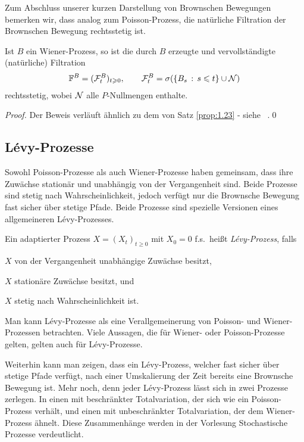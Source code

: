 Zum Abschluss unserer kurzen Darstellung von Brownschen
Bewegungen bemerken wir, dass analog zum Poisson-Prozess, die natürliche
Filtration der Brownschen Bewegung rechtsstetig ist.

\begin{prop}
\label{prop:1.28}
Ist $B$ ein Wiener-Prozess, so ist die durch $B$ erzeugte und vervollständigte
(natürliche) Filtration
  \begin{align*}
\F^B=(\FF_t^B)_{t\ge 0},\qquad \FF_t^B = \sigma(\setdef{B_s}{ s \le t}\cup \NN)
\end{align*}
rechtsstetig, wobei $\mathcal{N}$ alle $P$-Nullmengen enthalte.\fish
\end{prop}

\begin{proof}
Der Beweis verläuft ähnlich zu dem von Satz \ref{prop:1.23} - siehe
\cite[Proposition~2.7.7]{Karatzas:1991ws}~.\qed
\end{proof}

\subsection{L\'{e}vy-Prozesse}

Sowohl Poisson-Prozesse als auch Wiener-Prozesse haben gemeinsam, dass ihre
Zuwächse stationär und unabhängig von der Vergangenheit sind. Beide
Prozesse sind stetig nach Wahrscheinlichkeit, jedoch verfügt nur
die Brownsche Bewegung fast sicher über stetige Pfade. Beide Prozesse sind
spezielle Versionen eines allgemeineren L\'{e}vy-Prozesses.

\begin{defn}
\label{defn:1.16}
Ein adaptierter Prozess $X=(X_t)_{t \ge 0}$ mit $X_0=0$ f.s.\ heißt
\emph{L\'{e}vy-Prozess}, falls
\begin{defnenum}
\item $X$ von der Vergangenheit unabhängige Zuwächse besitzt,
\item $X$ stationäre Zuwächse besitzt, und
\item $X$ stetig nach Wahrscheinlichkeit ist.\fish
\end{defnenum}
\end{defn}

Man kann L\'{e}vy-Prozesse als eine Verallgemeinerung von Poisson- und
Wiener-Prozessen betrachten. Viele Aussagen, die für Wiener- oder
Poisson-Prozesse gelten, gelten auch für L\'{e}vy-Prozesse. 

Weiterhin kann man zeigen, dass ein L\'{e}vy-Prozess, welcher fast sicher über
stetige Pfade verfügt, nach einer Umskalierung der Zeit bereits eine Brownsche
Bewegung ist. Mehr noch, denn jeder L\'{e}vy-Prozess lässt sich in zwei Prozesse
zerlegen. In einen mit beschränkter Totalvariation, der sich wie ein
Poisson-Prozess verhält, und einen mit unbeschränkter Totalvariation, der dem
Wiener-Prozess ähnelt. Diese Zusammenhänge werden in der Vorlesung Stochastische
Prozesse verdeutlicht. 

